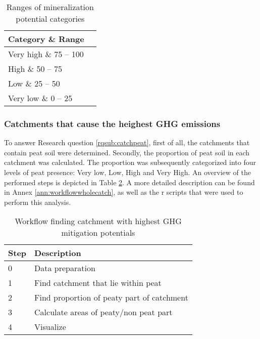 \documentclass[a4paper,12pt]{scrbook}
\begin{document}
\begin{table}[htbp]
\caption{Ranges of mineralization potential categories}
\begin{center}
\begin{tabular}{|l|l|}
\hline
Category \& Range \\ \hline
Very high \& 75 – 100 \\%
High \& 50 – 75 \\%
Low \& 25 – 50 \\%
Very low \& 0 – 25 \\%
\end{tabular}
\end{center}
\label{tab:minpotcatranges}
\end{table}



\subsubsection{Catchments that cause the heighest GHG emissions}

To answer Research question \ref{rqsub:catchpeat}, first of all, the catchments that contain peat soil were determined. Secondly, the proportion of peat soil in each catchment was calculated. The proportion was subsequently categorized into four levels of peat presence: Very low, Low, High and Very High. An overview of the performed steps is depicted in Table \ref{tab:workflowwholecatch}. A more detailed description can be found in Annex \ref{ann:workflowwholecatch}, as well as the r scripts that were used to perform this analysis.

\begin{table}[htbp]
\caption{Workflow finding catchment with highest GHG mitigation potentials}
\begin{center}
\begin{tabular}{|p{3cm}|p{7cm}|}
\hline
\multicolumn{1}{|l|}{\textbf{Step}} & \textbf{Description} \\ \hline
0 & Data preparation \\ \hline
1 & Find catchment that lie within peat \\ \hline
2 & Find proportion of peaty part of catchment \\ \hline
3 & Calculate areas of peaty/non peat part \\ \hline
4 & Visualize \\ \hline
\end{tabular}
\end{center}
\label{tab:workflowwholecatch}
\end{table}
\end{document}
